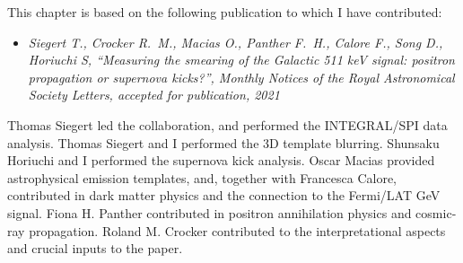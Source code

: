 \documentclass[doublespace,nopageskip]{VTthesis} %
\begin{document}
This chapter is based on the following publication to which I have contributed:
\begin{itemize}
    \item \emph{Siegert T., Crocker R.~M., Macias O., Panther F.~H., Calore F., Song D., Horiuchi S, “Measuring the smearing of the Galactic 511 keV signal: positron propagation or supernova kicks?”, Monthly Notices of the Royal Astronomical Society Letters, accepted for publication, 2021}
\end{itemize}
Thomas Siegert led the collaboration, and performed the INTEGRAL/SPI data analysis.
%
Thomas Siegert and I performed the 3D template blurring. Shunsaku Horiuchi and I performed the supernova kick analysis.
%
Oscar Macias provided astrophysical emission templates, and, together with Francesca Calore, contributed in dark matter physics and the connection to the Fermi/LAT GeV signal.
%
Fiona H. Panther contributed in positron annihilation physics and cosmic-ray propagation.
%
Roland M. Crocker contributed to the interpretational aspects and crucial inputs to the paper.
\end{document}
